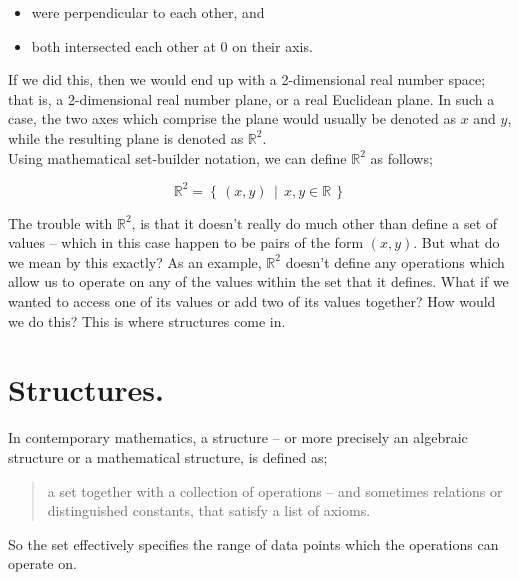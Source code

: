 \begin{itemize}[itemsep=0pt] %
    \item were perpendicular to each other, and
    \item both intersected each other at 0 on their axis.
\end{itemize}

If we did this, then we would end up with a 2-dimensional real number space; that is, a 2-dimensional real number plane,
or a real Euclidean plane. In such a case, the two axes which comprise the plane would usually be denoted as \(x\) and
\(y\), while the resulting plane is denoted as \(\mathbb{R}^2\). \\

Using mathematical set-builder notation, we can define \(\mathbb{R}^2\) as follows;

\begin{equation*}
    \mathbb{R}^2 = \left\{ \, (x,y) \;\, | \;\, x,y \in \mathbb{R} \, \right\}
\end{equation*}
\vspace{0\baselineskip}

The trouble with \(\mathbb{R}^2\), is that it doesn't really do much other than define a set of values -- which in this
case happen to be pairs of the form \((x,y)\). But what do we mean by this exactly? As an example, \(\mathbb{R}^2\)
doesn't define any operations which allow us to operate on any of the values within the set that it defines. What if we
wanted to access one of its values or add two of its values together? How would we do this? This is where structures
come in.


\section{Structures.}

In contemporary mathematics, a structure -- or more precisely an algebraic structure or a mathematical structure, is
defined as;

\begin{framed}
\setlength{\topsep}{0pt}
\setlength{\partopsep}{0pt}
\begin{quote}
    a set together with a collection of operations -- and sometimes relations or distinguished constants, that satisfy a
    list of axioms.
\end{quote}
\end{framed}

So the set effectively specifies the range of data points which the operations can operate on. \\

